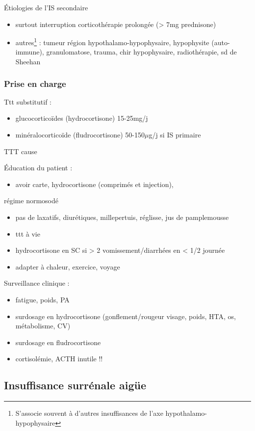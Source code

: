 \documentclass[11pt]{article}
\begin{document}
Étiologies de l'IS secondaire 
\begin{itemize}
\item surtout interruption corticothérapie prolongée (> 7mg prednisone)
\item autres\footnote{S'associe souvent à d'autres insuffisances de l'axe hypothalamo-hypophysaire} : tumeur région hypothalamo-hypophysaire, hypophysite (auto-immune),
granulomatose, trauma, chir hypophysaire, radiothérapie, sd de Sheehan
\end{itemize}

\subsubsection{Prise en charge}
\label{sec:org3edea06}
Ttt substitutif :
\begin{itemize}
\item glucocorticoïdes (hydrocortisone) 15-25mg/j
\item minéralocorticoïde (fludrocortisone) 50-150\(\mu\)g/j si IS primaire
\end{itemize}

TTT cause

Éducation du patient : 
\begin{itemize}
\item avoir carte, hydrocortisone (comprimés et injection),
\end{itemize}
régime normosodé
\begin{itemize}
\item pas de laxatifs, diurétiques, millepertuis, réglisse, jus de pamplemousse
\item ttt à vie
\item hydrocortisone en SC si > 2 vomissement/diarrhées en < 1/2 journée
\item adapter à chaleur, exercice, voyage
\end{itemize}

Surveillance clinique :
\begin{itemize}
\item fatigue, poids, PA
\item surdosage en hydrocortisone (gonflement/rougeur visage, \inc poids, HTA, os,
métabolisme, CV)
\item surdosage en fludrocortisone
\item cortisolémie, ACTH inutile !!
\end{itemize}

\subsection{Insuffisance surrénale aigüe}
\label{sec:org266f5c1}
\end{document}
